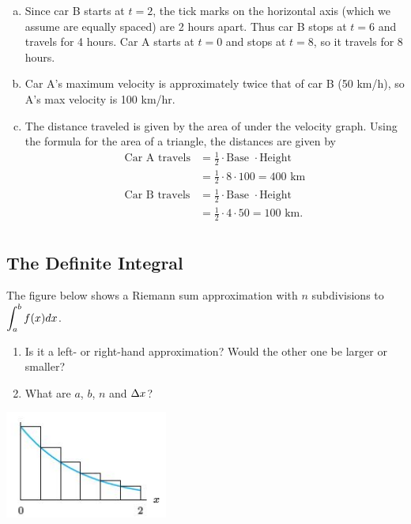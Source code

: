 \begin{enumerate}[1.]
\begin{multicols}{2}
  \begin{Solution}
    \begin{enumerate}[(a)]
    \item Since car B starts at $t = 2$, the tick marks on the
      horizontal axis (which we assume are equally spaced) are 2 hours
      apart. Thus car B stops at $t = 6$ and travels for 4 hours.  Car
      A starts at $t = 0$ and stops at $t = 8$, so it travels for 8
      hours.
    \item Car A's maximum velocity is approximately twice that of car B (50 km/h), so A's max velocity is 100 km/hr.
    \item The distance traveled is given by the area of under the
      velocity graph. Using the formula for the area of a triangle,
      the distances are given by
\begin{align*}
\mbox{Car A travels} &=
\frac{1}{2} \cdot \mbox{Base }\cdot \mbox{Height} \\
& = \frac{1}{2} \cdot 8 \cdot 100 = 400 \mbox{ km} \\
\mbox{Car B travels} &=
\frac{1}{2} \cdot \mbox{Base }\cdot \mbox{Height}\\
& = \frac{1}{2} \cdot 4 \cdot 50 = 100 \mbox{ km}. \\
\end{align*}
    
    \end{enumerate}
  \end{Solution}

\end{multicols}
\hrulefill
\subsection*{The Definite Integral}

\begin{multicols}{2}
\item
  \begin{Question}
    The figure below shows a Riemann sum approximation with $n$ subdivisions to $\displaystyle \int_a^bf(x) dx$.
    \begin{enumerate}
    \item Is it a left- or right-hand approximation? Would the other one be larger or smaller? 
    \item What are $a$, $b$, $n$ and $\Delta x$?
    \end{enumerate}
\includegraphics[width=0.4\linewidth]{graphics/Week04_TheDefiniteIntegral/DefiniteIntegral1}
  \end{Question}


\end{multicols}
\end{enumerate}

